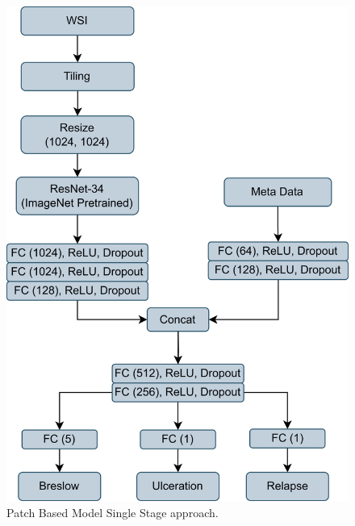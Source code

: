 \documentclass[conference]{IEEEtran}
\begin{document}
\begin{figure}[h!]
  \centering
    \includegraphics[scale=0.55]{images/page5.png}
  \caption{Patch Based Model Single Stage approach.}
  \label{fig:pbm_ss}
\end{figure}
\end{document}
